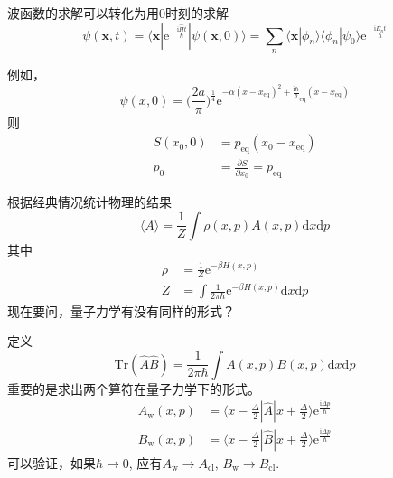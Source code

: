         波函数的求解可以转化为用0时刻的求解
        \begin{equation*}
            \psi(\bm{x},t) = \langle \bm{x} | \mathrm{e}^{-\frac {\mathrm{i}\hat{H}t}{\hbar}} | \psi(\bm{x},0) \rangle = \sum_n \langle \bm{x}|\phi_n \rangle \langle \phi_n |\psi_0 \rangle \mathrm{e}^{-\frac {\mathrm{i}E_n t}{\hbar}}
        \end{equation*}

        例如，
        \begin{equation*}
            \psi(x,0) =  \bigg(\frac {2a}{\pi}\bigg)^{\frac 14} \mathrm{e}^{-\alpha (x - x_{\mathrm{eq}})^2 +\frac {\mathrm{i}{\hbar}} p_{\mathrm{eq}}(x - x_\mathrm{eq})}
        \end{equation*}
        则
        \begin{align*}
            S(x_0,0) &= p_\mathrm{eq} (x_0 - x_\mathrm{eq})\\
            p_0 &= \frac {\partial S}{\partial x_0} = p_\mathrm{eq}
        \end{align*}

        根据经典情况统计物理的结果
        \begin{equation*}
            \langle A \rangle =\frac 1Z \int \rho(x,p)A(x,p) \mathrm{d}x\mathrm{d}p
        \end{equation*}
        其中 
        \begin{align*}
            \rho &= \frac 1Z \mathrm{e}^{-\beta H(x,p)}\\
            Z &= \int \frac 1{2\pi \hbar} \mathrm{e}^{-\beta H(x,p)} \mathrm{d}x \mathrm{d}p
        \end{align*}
        现在要问，量子力学有没有同样的形式？

        定义
        \begin{equation*}
            \mathrm{Tr} (\hat{A}\hat{B}) = \frac 1{2\pi\hbar}\int A(x,p)B(x,p) \mathrm{d}x \mathrm{d}p
        \end{equation*}
        重要的是求出两个算符在量子力学下的形式。
        \begin{align*}
            A_\mathrm{w}(x,p) &= \langle x - \frac {\Delta}2 | \hat{A} | x + \frac {\Delta}2 \rangle \mathrm{e}^{\frac {\mathrm{i}\Delta p}{\hbar}}\\
            B_\mathrm{w}(x,p) &= \langle x - \frac {\Delta}2 | \hat{B} | x + \frac {\Delta}2 \rangle \mathrm{e}^{\frac {\mathrm{i}\Delta p}{\hbar}}
        \end{align*}
        可以验证，如果$\hbar \to 0$, 应有$A_\mathrm{w} \to A_\mathrm{cl}$, $B_\mathrm{w} \to B_\mathrm{cl}$. 

